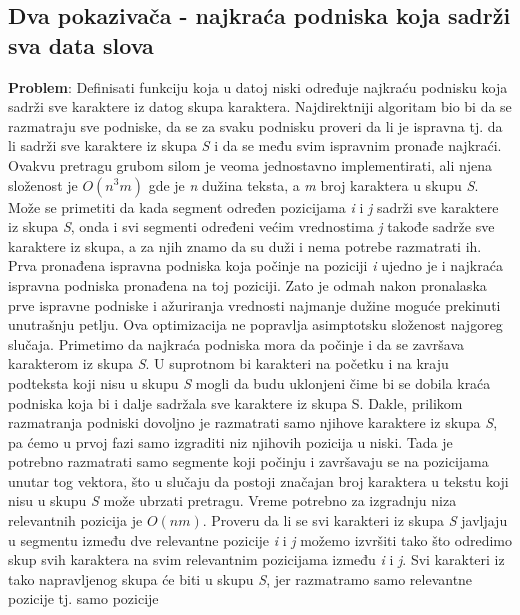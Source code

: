 \documentclass{article}
\begin{document}
\subsection{Dva pokazivača - najkraća podniska koja sadrži sva data slova}
\textbf{Problem}: Definisati funkciju koja u datoj niski određuje najkraću podnisku
koja sadrži sve karaktere iz datog skupa karaktera.
\newline
Najdirektniji algoritam bio bi da se razmatraju sve podniske, da se za svaku podnisku proveri da li je ispravna
tj. da li sadrži sve karaktere iz skupa \textit{S} i da se među svim ispravnim pronađe
najkraći. Ovakvu pretragu grubom silom je veoma jednostavno implementirati,
ali njena složenost je $O(n^3m)$ gde je \textit{n} dužina teksta, a \textit{m} broj karaktera u
skupu \textit{S}.
\newline
Može se primetiti da kada segment određen pozicijama \textit{i} i \textit{j} sadrži sve karaktere iz skupa \textit{S}, onda i svi segmenti
određeni većim vrednostima \textit{j} takođe sadrže sve karaktere iz skupa, a za
njih znamo da su duži i nema potrebe razmatrati ih. Prva pronađena ispravna podniska koja počinje na
poziciji \textit{i} ujedno je i najkraća ispravna podniska pronađena na toj poziciji. Zato
je odmah nakon pronalaska prve ispravne podniske i ažuriranja vrednosti
najmanje dužine moguće prekinuti unutrašnju petlju. Ova
optimizacija ne popravlja asimptotsku složenost najgoreg slučaja.
\newline
Primetimo da najkraća podniska mora da počinje i da se završava karakterom iz skupa \textit{S}. U suprotnom bi karakteri na početku i na kraju podteksta
koji nisu u skupu \textit{S} mogli da budu uklonjeni čime bi se dobila kraća podniska
koja bi i dalje sadržala sve karaktere iz skupa S. Dakle, prilikom razmatranja
podniski dovoljno je razmatrati samo njihove karaktere iz skupa \textit{S}, pa ćemo u prvoj fazi samo izgraditi niz njihovih pozicija u niski. Tada je potrebno razmatrati samo segmente koji
počinju i završavaju se na pozicijama unutar tog vektora, što u slučaju da postoji
značajan broj karaktera u tekstu koji nisu u skupu \textit{S} može ubrzati pretragu.
Vreme potrebno za izgradnju niza relevantnih pozicija je $O(nm)$.
\newline
Proveru da li se svi karakteri iz skupa \textit{S} javljaju u segmentu između dve relevantne
pozicije \textit{i} i \textit{j} možemo izvršiti tako što odredimo skup svih karaktera na svim
relevantnim pozicijama između \textit{i} i \textit{j}. Svi karakteri iz tako napravljenog skupa
će biti u skupu \textit{S}, jer razmatramo samo relevantne pozicije tj. samo pozicije
\end{document}
